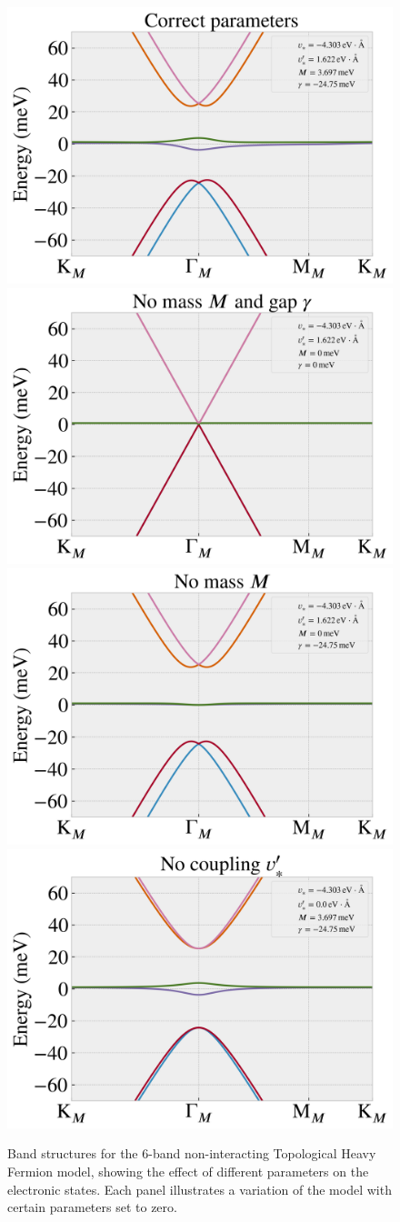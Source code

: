 \begin{figure}[H]
\centering
\includegraphics[height=0.35\linewidth]{fig/thf-correct_params.png} \hfill
\includegraphics[height=0.35\linewidth]{fig/thf-no_M_no_gamma.png}
\includegraphics[height=0.35\linewidth]{fig/thf-no_M.png} \hfill
\includegraphics[height=0.35\linewidth]{fig/thf-no_coupling.png}
\caption{Band structures for the 6-band non-interacting Topological Heavy Fermion model, showing the effect of different parameters on the electronic states. Each panel illustrates a variation of the model with certain parameters set to zero.}
\label{fig:thf-exploration}
\end{figure}

